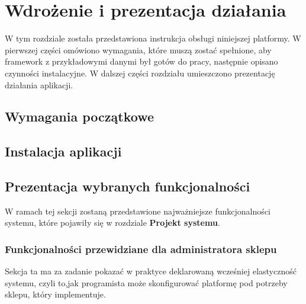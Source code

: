 \chapter{Wdrożenie i prezentacja działania}
\thispagestyle{chapterBeginStyle}

W tym rozdziale została przedstawiona instrukcja obsługi niniejszej platformy. W pierwszej części omówiono wymagania, które muszą zostać spełnione, aby framework z przykładowymi danymi był gotów do pracy, następnie opisano czynności instalacyjne. 
W dalszej części rozdziału umieszczono prezentację działania aplikacji.  

\section{Wymagania początkowe}

\section{Instalacja aplikacji}

\section{Prezentacja wybranych funkcjonalności}

W ramach tej sekcji zostaną przedstawione najważniejsze funkcjonalności systemu, które pojawiły się w rozdziale \textbf{Projekt systemu}.  

\subsection{Funkcjonalności przewidziane dla administratora sklepu}
Sekcja ta ma za zadanie pokazać w praktyce deklarowaną wcześniej elastyczność systemu, czyli to,jak programista może skonfigurować platformę pod potrzeby sklepu, który implementuje.

